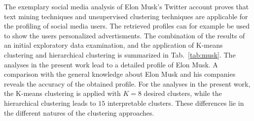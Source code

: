 The exemplary social media analysis of Elon Musk's Twitter account proves that text mining techniques and unsupervised clustering techniques are applicable for the profiling of social media users. The retrieved profiles can for example be used to show the users personalized advertisments. The combination of the results of an initial exploratory data examination, and the application of K-means clustering and hierarchical clustering is summarized in Tab.~\ref{tab:musk}. The analyses in the present work lead to a detailed profile of Elon Musk. A comparison with the general knowledge about Elon Musk and his companies reveals the accuracy of the obtained profile. For the analyses in the present work, the K-means clustering is applied with $K=8$ desired clusters, while the hierarchical clustering leads to $15$ interpretable clusters. These differences lie in the different natures of the clustering approaches.